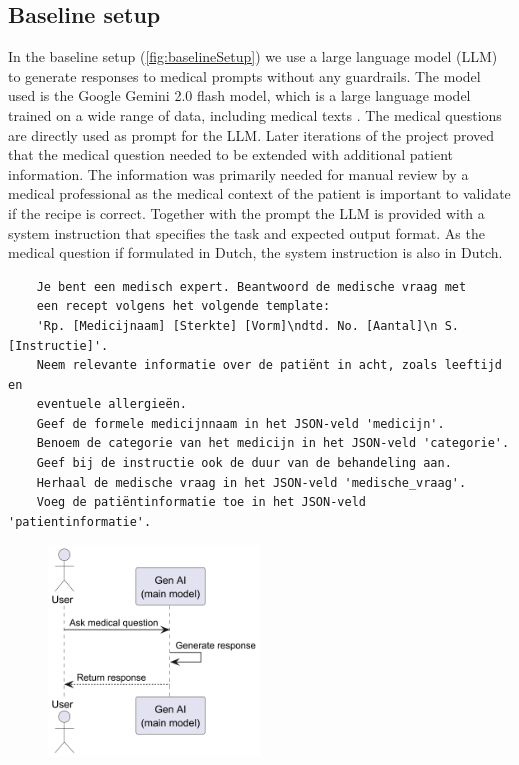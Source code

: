 \subsection{Baseline setup}
In the baseline setup (\autoref{fig:baselineSetup}) we use a large language model (LLM) to generate responses to medical prompts without any guardrails.
The model used is the Google Gemini 2.0 flash model, which is a large language model trained on a wide range of data, including medical texts \citep{saab2024capabilities}.
The medical questions are directly used as prompt for the LLM.
Later iterations of the project proved that the medical question needed to be extended with additional patient information.
The information was primarily needed for manual review by a medical professional as the medical context of the patient is important to validate if the recipe is correct.
Together with the prompt the LLM is provided with a system instruction that specifies the task and expected output format.
As the medical question if formulated in Dutch, the system instruction is also in Dutch.
\begin{verbatim}
    Je bent een medisch expert. Beantwoord de medische vraag met
    een recept volgens het volgende template:
    'Rp. [Medicijnaam] [Sterkte] [Vorm]\ndtd. No. [Aantal]\n S. [Instructie]'.
    Neem relevante informatie over de patiënt in acht, zoals leeftijd en
    eventuele allergieën.
    Geef de formele medicijnnaam in het JSON-veld 'medicijn'.
    Benoem de categorie van het medicijn in het JSON-veld 'categorie'.
    Geef bij de instructie ook de duur van de behandeling aan.
    Herhaal de medische vraag in het JSON-veld 'medische_vraag'.
    Voeg de patiëntinformatie toe in het JSON-veld 'patientinformatie'.
\end{verbatim}

\begin{figure}[H]
    \includegraphics[width=0.5\textwidth]{figures/baselineSetupSequenceDiagram.png}
    \label{fig:baselineSetup}
\end{figure}

